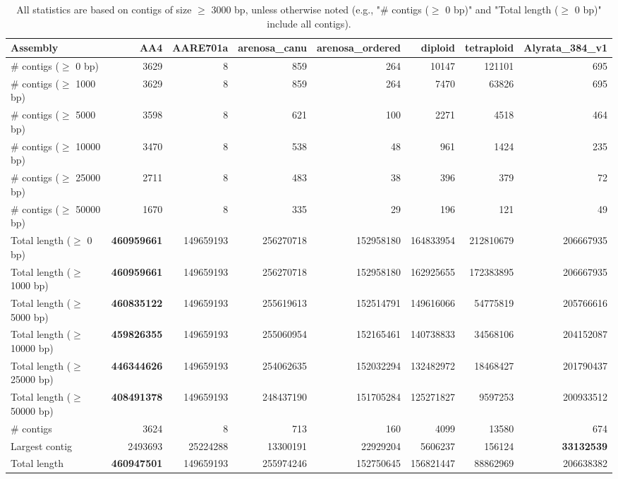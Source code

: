 \documentclass[12pt,a4paper]{article}
\begin{document}
\begin{table}[ht]
\begin{center}
\caption{All statistics are based on contigs of size $\geq$ 3000 bp, unless otherwise noted (e.g., "\# contigs ($\geq$ 0 bp)" and "Total length ($\geq$ 0 bp)" include all contigs).}
\begin{tabular}{|l*{7}{|r}|}
\hline
Assembly & AA4 & AARE701a & arenosa\_canu & arenosa\_ordered & diploid & tetraploid & Alyrata\_384\_v1 \\ \hline
\# contigs ($\geq$ 0 bp) & 3629 & 8 & 859 & 264 & 10147 & 121101 & 695 \\ \hline
\# contigs ($\geq$ 1000 bp) & 3629 & 8 & 859 & 264 & 7470 & 63826 & 695 \\ \hline
\# contigs ($\geq$ 5000 bp) & 3598 & 8 & 621 & 100 & 2271 & 4518 & 464 \\ \hline
\# contigs ($\geq$ 10000 bp) & 3470 & 8 & 538 & 48 & 961 & 1424 & 235 \\ \hline
\# contigs ($\geq$ 25000 bp) & 2711 & 8 & 483 & 38 & 396 & 379 & 72 \\ \hline
\# contigs ($\geq$ 50000 bp) & 1670 & 8 & 335 & 29 & 196 & 121 & 49 \\ \hline
Total length ($\geq$ 0 bp) & {\bf 460959661} & 149659193 & 256270718 & 152958180 & 164833954 & 212810679 & 206667935 \\ \hline
Total length ($\geq$ 1000 bp) & {\bf 460959661} & 149659193 & 256270718 & 152958180 & 162925655 & 172383895 & 206667935 \\ \hline
Total length ($\geq$ 5000 bp) & {\bf 460835122} & 149659193 & 255619613 & 152514791 & 149616066 & 54775819 & 205766616 \\ \hline
Total length ($\geq$ 10000 bp) & {\bf 459826355} & 149659193 & 255060954 & 152165461 & 140738833 & 34568106 & 204152087 \\ \hline
Total length ($\geq$ 25000 bp) & {\bf 446344626} & 149659193 & 254062635 & 152032294 & 132482972 & 18468427 & 201790437 \\ \hline
Total length ($\geq$ 50000 bp) & {\bf 408491378} & 149659193 & 248437190 & 151705284 & 125271827 & 9597253 & 200933512 \\ \hline
\# contigs & 3624 & 8 & 713 & 160 & 4099 & 13580 & 674 \\ \hline
Largest contig & 2493693 & 25224288 & 13300191 & 22929204 & 5606237 & 156124 & {\bf 33132539} \\ \hline
Total length & {\bf 460947501} & 149659193 & 255974246 & 152750645 & 156821447 & 88862969 & 206638382 \\ \hline

\end{tabular}
\end{center}
\end{table}
\end{document}
